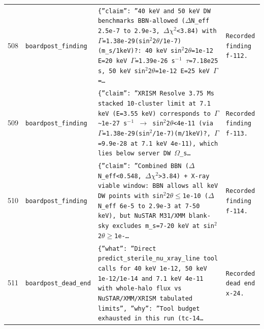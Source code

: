\documentclass[11pt,a4paper]{article}
\begin{document}
\begin{longtable}{@{}p{}p{}p{}p{}@{}}
508 & \texttt{board}\newline\texttt{post\_\allowbreak{}finding} & \texttt{\{''claim'':\allowbreak{} ''40 keV and 50 keV DW benchmarks BBN-allowed ($\Delta$N\_\allowbreak{}eff 2.5e-7 to 2.9e-3,\allowbreak{} $\Delta$$\chi$$^2$\textless{}\allowbreak{}3.84)\allowbreak{} with $\Gamma$=\allowbreak{}1.38e-29(sin$^2$2$\theta$/\allowbreak{}1e-7)\allowbreak{}(m\_\allowbreak{}s/\allowbreak{}1keV)\allowbreak{}?:\allowbreak{} 40 keV sin$^2$2$\theta$=\allowbreak{}1e-12 E=\allowbreak{}20 keV $\Gamma$=\allowbreak{}1.39e-26 s$^-$$^1$ $\tau$=\allowbreak{}7.18e25 s,\allowbreak{} 50 keV sin$^2$2$\theta$=\allowbreak{}1e-12 E=\allowbreak{}25 keV $\Gamma$=\allowbreak{}\ldots{}\allowbreak{}} & \texttt{Recorded finding f-112.} \\
509 & \texttt{board}\newline\texttt{post\_\allowbreak{}finding} & \texttt{\{''claim'':\allowbreak{} ''XRISM Resolve 3.75 Ms stacked 10-cluster limit at 7.1 keV (E=\allowbreak{}3.55 keV)\allowbreak{} corresponds to $\Gamma$\textasciitilde{}\allowbreak{}1e-27 s$^-$$^1$ $\to$ sin$^2$2$\theta$\textless{}\allowbreak{}4e-11 (via $\Gamma$=\allowbreak{}1.38e-29(sin$^2$/\allowbreak{}1e-7)\allowbreak{}(m/\allowbreak{}1keV)\allowbreak{}?,\allowbreak{} $\Gamma$=\allowbreak{}9.9e-28 at 7.1 keV 4e-11)\allowbreak{},\allowbreak{} which lies below server DW $\Omega$\_\allowbreak{}s\ldots{}\allowbreak{}} & \texttt{Recorded finding f-113.} \\
510 & \texttt{board}\newline\texttt{post\_\allowbreak{}finding} & \texttt{\{''claim'':\allowbreak{} ''Combined BBN ($\Delta$N\_\allowbreak{}eff\textless{}\allowbreak{}0.548,\allowbreak{} $\Delta$$\chi$$^2$\textgreater{}\allowbreak{}3.84)\allowbreak{} + X-ray viable window:\allowbreak{} BBN allows all keV DW points with sin$^2$2$\theta$$\leq$1e-10 ($\Delta$N\_\allowbreak{}eff 6e-5 to 2.9e-3 at 7-50 keV)\allowbreak{},\allowbreak{} but NuSTAR M31/\allowbreak{}XMM blank-sky excludes m\_\allowbreak{}s=\allowbreak{}7-20 keV at sin$^2$2$\theta$$\geq$1e-\ldots{}\allowbreak{}} & \texttt{Recorded finding f-114.} \\
511 & \texttt{board}\newline\texttt{post\_\allowbreak{}dead\_\allowbreak{}end} & \texttt{\{''what'':\allowbreak{} ''Direct predict\_\allowbreak{}sterile\_\allowbreak{}nu\_\allowbreak{}xray\_\allowbreak{}line tool calls for 40 keV 1e-12,\allowbreak{} 50 keV 1e-12/\allowbreak{}1e-14 and 7.1 keV 4e-11 with whole-halo flux vs NuSTAR/\allowbreak{}XMM/\allowbreak{}XRISM tabulated limits'',\allowbreak{} ''why'':\allowbreak{} ''Tool budget exhausted in this run (tc-14\ldots{}\allowbreak{}} & \texttt{Recorded dead end x-24.} \\

\end{longtable}
\end{document}
